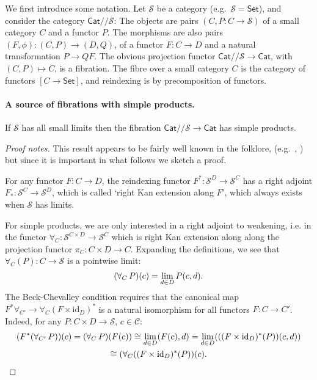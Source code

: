 \documentclass[a4paper,UKenglish]{lipics}
\newcommand{\msf}[1]{\mathsf{#1}} %
\newcommand{\Set}{\msf{Set}}
\newcommand{\Cat}{\msf{Cat}}
\newcommand{\sslice}{/\!/}
\newcommand{\id}{\mathrm{id}}
\begin{document}
We first introduce some notation.
Let $\mathcal S$ be a category (e.g.~$\mathcal S=\Set$), and
consider the category $\Cat\sslice\mathcal S$:
The objects are pairs $(C,P:C\to \mathcal S)$ of a small category $C$ and a functor $P$.
The morphisms are also pairs $(F,\phi):(C,P)\to (D,Q)$,
of a functor $F:C\to D$ and a natural transformation
$P\to QF$.
The obvious projection functor $\Cat\sslice \mathcal S\to \Cat$,
with $(C,P)\mapsto C$,
is a fibration. The fibre over a small category $C$ is the category
of functors $[C\to\Set]$, and reindexing is by precomposition of functors.

\paragraph*{A source of fibrations with simple products.}
\begin{theorem}
\label{thm:BC}
If $\mathcal S$ has all small limits
then the fibration $\Cat\sslice \mathcal S\to \Cat$ has simple products.
\end{theorem}
\begin{proof}[Proof notes]
This result appears to be fairly well known in the folklore,
(e.g.~\cite[end of \S 3]{lawvere-adjointness}, \cite{mellies-zeilberger})
but since it is important in what follows we sketch a proof.

For any functor $F:C\to D$,
the reindexing functor $F^*:\mathcal S^D\to \mathcal S^C$
has a right adjoint
$F_*:\mathcal S^C\to\mathcal S^D$, which is called `right Kan extension along $F$',
which always exists when $\mathcal S$ has limits.

For simple products, we are only interested in a right adjoint to weakening,
i.e. in the functor $\forall_C:\mathcal S^{C\times D}\to \mathcal S^C$
which is right Kan extension along
along the projection functor $\pi_C:C\times D\to C$.
Expanding the definitions, we see that $\forall_C(P):C\to\mathcal S$ is
a pointwise limit:
\begin{equation}
(\forall_C\,P)(c)=\lim_{d\in D}P(c,d)\text.
\label{eqn:forall-limit}
\end{equation}
The Beck-Chevalley condition requires that the canonical map
$
F^*\forall_{C'}
\to
\forall_{C}(F\times \id_D)^*
$
is a natural isomorphism for all functors $F:C\to C'$.
Indeed, for any
$P:C\times D\to \mathcal S$, $c\in \mathcal C$:
\begin{multline*}
(F^*(\forall_{C'}\,P))(c)
=
(\forall_C\,P)(F(c))
\cong
\lim_{d\in D}(F(c),d)
=
\lim_{d\in D}(((F\times \id_D)^*(P))(c,d))
\\\cong
(\forall_{C}((F\times \id_D)^*(P))(c)
\text.
\end{multline*}
\end{proof}
\end{document}
